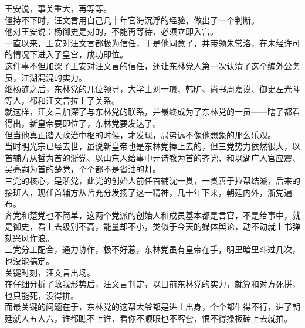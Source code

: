\begin{multicols}{\theparacolNo}
王安说，事关重大，再等等。\\

僵持不下时，汪文言用自己几十年官海沉浮的经验，做出了一个判断。\\

他对王安说：杨御史是对的，不能再等待，必须立即入宫。\\

一直以来，王安对汪文言都极为信任，于是他同意了，并带领朱常洛，在未经许可的情况下进入了皇宫，成功即位。\\

这件事不但加深了王安对汪文言的信任，还让东林党人第一次认清了这个编外公务员，江湖混混的实力。\\

继杨涟之后，东林党的几位领导，大学士刘一璟、韩旷、尚书周嘉谟、御史左光斗等人，都和汪文言拉上了关系。\\

就这样，汪文言加深了与东林党的联系，并最终成为了东林党的一员——瞎子都看得出，新皇帝要即位了，东林党要发达了。\\

但当他真正踏入政治中枢的时候，才发现，局势远不像他想象的那么乐观。\\

当时明光宗已经去世，虽说新皇帝也是东林党捧上去的，但三党势力依然很大，以首辅方从哲为首的浙党、以山东人给事中亓诗教为首的齐党、和以湖广人官应震、吴亮嗣为首的楚党，个个都不是省油的灯。\\

三党的核心，是浙党，此党的创始人前任首辅沈一贯，一贯善于拉帮结派，后来的接班人，现任首辅方从哲充分发扬了这一精神，几十年下来，朝廷内外，浙党遍布。\\

齐党和楚党也不简单，这两个党派的创始人和成员基本都是言官，不是给事中，就是御史，看上去级别不高，能量却不小，类似于今天的媒体舆论，动不动就上书弹劾兴风作浪。\\

三党分工配合，通力协作，极不好惹，东林党虽有皇帝在手，明里暗里斗过几次，也没能搞定。\\

关键时刻，汪文言出场。\\

在仔细分析了敌我形势后，汪文言判定，以目前东林党的实力，就算和对方死拼，也只能死，没得拼。\\

而最关键的问题在于，东林党的这帮大爷都是进士出身，个个都牛得不行，进了朝廷就人五人六，谁都瞧不上谁，看你不顺眼也不客套，恨不得操板砖上去就拍。\\


\end{multicols}

